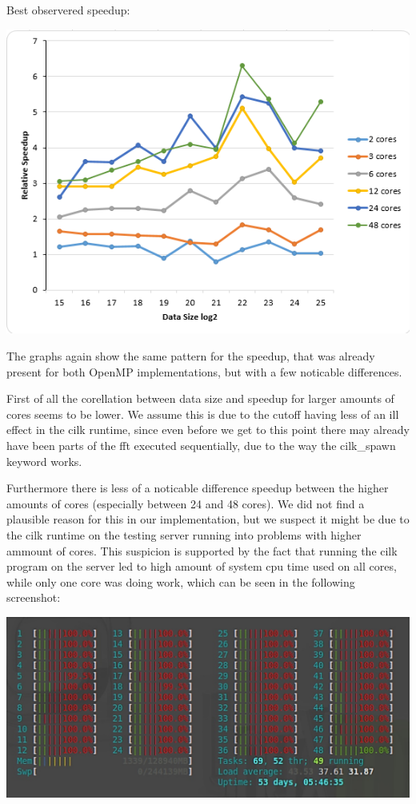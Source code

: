 Best observered speedup:

\includegraphics[width=\textwidth]{cilk_rec_best.png}

The graphs again show the same pattern for the speedup, that was already present for both OpenMP implementations, but with a few noticable differences.

First of all the corellation between data size and speedup for larger amounts of cores seems to be lower. We assume this is due to the cutoff having less of an ill effect in the cilk runtime, since even before we get to this point there may already have been parts of the fft executed sequentially, due to the way the cilk\_spawn keyword works. 

Furthermore there is less of a noticable difference speedup between the higher amounts of cores (especially between 24 and 48 cores). We did not find a plausible reason for this in our implementation, but we suspect it might be due to the cilk runtime on the testing server running into problems with higher ammount of cores. This suspicion is supported by the fact that running the cilk program on the server led to high amount of system cpu time used on all cores, while only one core was doing work, which can be seen in the following screenshot: 

\includegraphics[width=\textwidth]{cpu_util_cilk.jpg}
